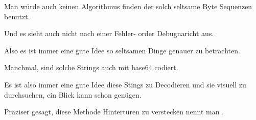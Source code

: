 Man w\"urde auch keinen Algorithmus finden der solch seltsame Byte Sequenzen benutzt.


Und es sieht auch nicht nach einer Fehler- order Debugnaricht aus.


Also es ist immer eine gute Idee so seltsamen Dinge genauer zu betrachten.


Manchmal, sind solche Strings auch mit base64 codiert.

Es ist also immer eine gute Idee diese Stings zu Decodieren und sie visuell zu durchsuchen, ein Blick
kann schon gen\"ugen.

Pr\"aziser gesagt, diese Methode Hintert\"uren zu verstecken nennt man .
